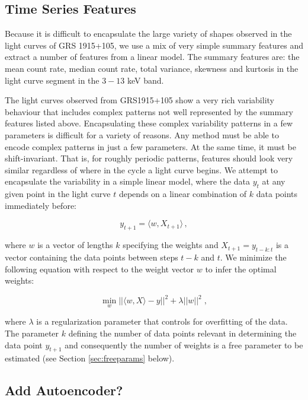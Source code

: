 \documentclass[12pt]{emulateapj}
\begin{document}
\subsection{Time Series Features}

Because it is difficult to encapsulate the large variety of shapes observed in the light curves of GRS 1915+105, we use a mix of very simple summary features and extract a number of features from a linear model. The summary features are: the mean count rate, median count rate, total variance, skewness and kurtosis in the light curve segment in the $3 - 13$ keV band. 

The light curves observed from GRS1915+105 show a very rich variability behaviour that includes complex patterns not well represented by the summary features listed above. Encapsulating these complex variability patterns in a few parameters is difficult for a variety of reasons. Any method must be able to encode complex patterns in just a few parameters. At the same time, it must be shift-invariant. That is, for roughly periodic patterns, features should look very similar regardless of where in the cycle a light curve begins. We attempt to encapsulate the variability in a simple linear model, where the data $y_t$ at any given point in the light curve $t$ depends on a linear combination of $k$ data points immediately before:

\begin{equation}
y_{t+1} = \langle w, X_{t+1} \rangle \, ,
\end{equation}

\noindent  where $w$ is a vector of lengths $k$ specifying the weights and $X_{t+1} = y_{t-k:t}$ is a vector containing the data points between steps $t-k$ and $t$.
We minimize the following equation with respect to the weight vector $w$ to infer the optimal weights:

\begin{equation}
\min_w ||\langle w, X \rangle - y||^2 + \lambda ||w||^2 \; ,
\end{equation}

\noindent where $\lambda$ is a regularization parameter that controls for overfitting of the data. The parameter $k$ defining the number of data points relevant in determining the data point $y_{t+1}$ and consequently the number of weights is a free parameter to be estimated (see Section \ref{sec:freeparams} below).

\subsection{Add Autoencoder?}
\end{document}
